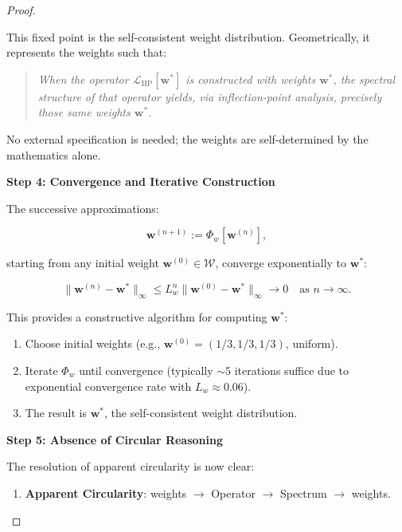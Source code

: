 \begin{lemma}
\begin{proof}
\begin{lemma}
This fixed point is the self-consistent weight distribution. Geometrically, it represents the weights such that:

\begin{quote}
\textit{When the operator $\mathcal{L}_{\mathrm{HP}}[\mathbf{w}^*]$ is constructed with weights $\mathbf{w}^*$, the spectral structure of that operator yields, via inflection-point analysis, precisely those same weights $\mathbf{w}^*$.}
\end{quote}

No external specification is needed; the weights are self-determined by the mathematics alone.

\textbf{Step 4: Convergence and Iterative Construction}

The successive approximations:

\begin{equation}
\mathbf{w}^{(n+1)} := \Phi_w[\mathbf{w}^{(n)}],
\end{equation}

starting from any initial weight $\mathbf{w}^{(0)} \in \mathcal{W}$, converge exponentially to $\mathbf{w}^*$:

\begin{equation}
\|\mathbf{w}^{(n)} - \mathbf{w}^*\|_\infty \leq L_w^n \|\mathbf{w}^{(0)} - \mathbf{w}^*\|_\infty \to 0 \quad \text{as } n \to \infty.
\end{equation}

This provides a constructive algorithm for computing $\mathbf{w}^*$:

\begin{enumerate}
\item Choose initial weights (e.g., $\mathbf{w}^{(0)} = (1/3, 1/3, 1/3)$, uniform).
\item Iterate $\Phi_w$ until convergence (typically $\sim 5$ iterations suffice due to exponential convergence rate with $L_w \approx 0.06$).
\item The result is $\mathbf{w}^*$, the self-consistent weight distribution.
\end{enumerate}

\textbf{Step 5: Absence of Circular Reasoning}

The resolution of apparent circularity is now clear:

\begin{enumerate}

\item \textbf{Apparent Circularity}: weights $\to$ Operator $\to$ Spectrum $\to$ weights.


\end{enumerate}
\end{lemma}
\end{proof}
\end{lemma}
